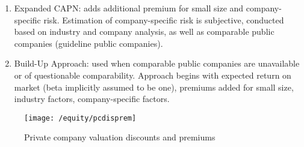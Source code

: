 \begin{remark} 
\begin{enumerate}[label=\roman*.]
\setlength{\itemsep}{0pt}
\item Expanded CAPN: adds additional premium for small size and company-specific risk. Estimation of company-specific risk is subjective, conducted based on industry and company analysis, as well as comparable public companies (guideline public companies).
\item Build-Up Approach: used when comparable public companies are unavailable or of questionable comparability. Approach begins with expected return on market (beta implicitly assumed to be one), premiums added for small size, industry factors, company-specific factors.
\end{enumerate}
\end{remark}

\begin{figure}[H]
\centering
\texttt{[image: /equity/pcdisprem]}
\caption{Private company valuation discounts and premiums}
\end{figure}

